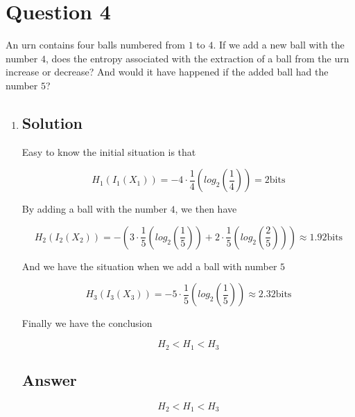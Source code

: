 \documentclass[12pt]{article}
\begin{document}
	
	\section*{Question 4}
	
	\noindent An urn contains four balls numbered from $1$ to $4$. If we add a new ball with the number $4$, does the entropy associated with the extraction of a ball from the urn increase or decrease? And would it have happened if the added ball had the number $5$?
	
	\bigskip
	
	\begin{enumerate}[label={},leftmargin=0in]\item
		\subsection*{Solution}
		
			Easy to know the initial situation is that
			
			\[
				H_1(I_1(X_1)) = -4 \cdot \frac{1}{4} \left(log_2\left(\frac{1}{4}\right)\right) = 2 \text{bits}
			\]
			
			By adding a ball with the number $4$, we then have
			
			\[
				H_2(I_2(X_2)) = - \left(
					3 \cdot \frac{1}{5} \left(log_2\left(\frac{1}{5}\right)\right) + 2 \cdot \frac{1}{5}\left(log_2\left(\frac{2}{5}\right)\right)
				\right) \approx 1.92 \text{bits}
			\]
			
			And we have the situation when we add a ball with number $5$
			
			\[
				H_3(I_3(X_3)) = - 5 \cdot \frac{1}{5} \left(log_2\left(\frac{1}{5}\right)\right) \approx 2.32 \text{bits}
			\]
			
			Finally we have the conclusion
			
			\[
				H_2 < H_1 < H_3
			\]
		
		\subsection*{Answer}
		
		\[\boxed{H_2 < H_1 < H_3}\]
	\end{enumerate}
	
\end{document}
